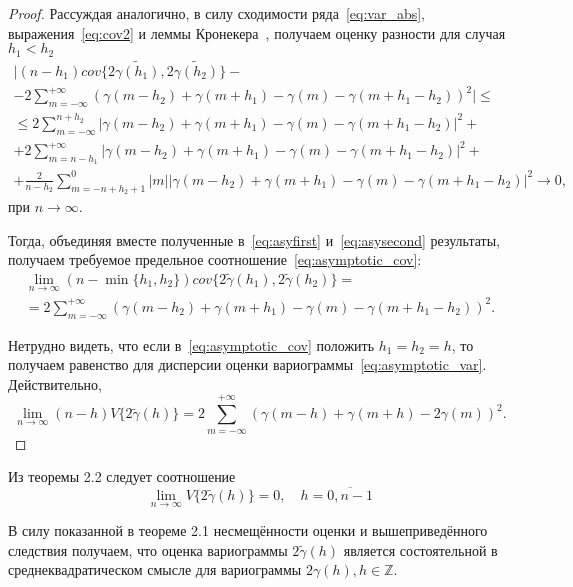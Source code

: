 \begin{proof}
Рассуждая аналогично, в силу сходимости ряда~\eqref{eq:var_abs}, выражения~\eqref{eq:cov2} и леммы Кронекера~\cite{shiryaev1980}, получаем оценку разности для случая $ h_1 < h_2 $
\begin{equation}\begin{gathered}
\label{eq:asysecond}
	\vert (n - h_1) cov \{ 2 \tilde{\gamma(h_1)}, 2 \tilde{\gamma(h_2)} \} - \\
	- 2 \sum_{m = -\infty}^{+ \infty} (\gamma(m - h_2) + \gamma(m + h_1) - \gamma(m) - \gamma(m + h_1 - h_2))^2 \vert \leq \\
	\leq 2 \sum_{m = -\infty}^{n + h_2} \vert \gamma(m - h_2) + \gamma(m + h_1) - \gamma(m) - \gamma(m + h_1 - h_2) \vert^2 + \\
	+ 2 \sum_{m = n - h_1}^{+ \infty} \vert \gamma(m - h_2) + \gamma(m + h_1) - \gamma(m) - \gamma(m + h_1 - h_2) \vert^2 + \\
	+ \frac{2}{n - h_2} \sum_{m = -n + h_2 + 1}^{0} \vert m \vert \vert \gamma(m - h_2) + \gamma(m + h_1) - \gamma(m) - \gamma(m + h_1 - h_2) \vert^2 \to 0,
\end{gathered}\end{equation}
при $ n \to \infty$.

Тогда, объединяя вместе полученные в~\eqref{eq:asyfirst} и~\eqref{eq:asysecond} результаты, получаем требуемое предельное соотношение~\eqref{eq:asymptotic_cov}:
\begin{equation*}\begin{gathered}
	\lim_{n \to \infty} (n - \min\{ h_1, h_2 \}) cov\{ 2 \tilde{\gamma}(h_1), 2 \tilde{\gamma}(h_2) \} = \\
	= 2 \sum_{m = -\infty}^{+\infty} (\gamma(m - h_2) + \gamma(m + h_1) - \gamma(m) - \gamma(m + h_1 - h_2))^2.
\end{gathered}\end{equation*}

Нетрудно видеть, что если в~\eqref{eq:asymptotic_cov} положить $ h_1 = h_2 = h $, то получаем равенство для дисперсии оценки вариограммы~\eqref{eq:asymptotic_var}. Действительно,
\begin{equation*}
	\lim_{n \to \infty} (n - h) V\{ 2 \tilde{\gamma}(h) \} = 2 \sum_{m = -\infty}^{+\infty} (\gamma(m - h) + \gamma(m + h) - 2 \gamma(m))^2.
\end{equation*}

\end{proof}

\begin{Corollary}
	Из теоремы 2.2 следует соотношение
	\begin{equation*}
		\lim_{n \to \infty} V\{ 2 \tilde{\gamma}(h) \} = 0, \quad h = \overline{0, n - 1}
	\end{equation*}
\end{Corollary}

\begin{Remark}
	В силу показанной в теореме 2.1 несмещённости оценки и вышеприведённого следствия получаем, что оценка вариограммы $ 2 \tilde{\gamma}(h) $ является состоятельной в среднеквадратическом смысле для вариограммы $ 2 \gamma(h), h \in \mathbb{Z} $.
\end{Remark}
